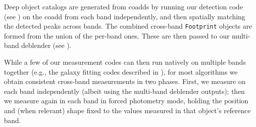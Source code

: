 Deep object catalogs are generated from coadds by running our detection code (see ) on the coadd from each band independently, and then spatially matching the detected peaks across bands.
The combined cross-band \texttt{Footprint} objects are formed from the union of the per-band ones.
These are then passed to our multi-band deblender (see ).

While a few of our measurement codes can then run natively on multiple bands together (e.g., the galaxy fitting codes described in ), for most algorithms we obtain consistent cross-band measurements in two phases.
First, we measure on each band independently (albeit using the multi-band deblender outputs); then we measure again in each band in forced photometry mode, holding the position and (when relevant) shape fixed to the values measured in that object's reference band.
